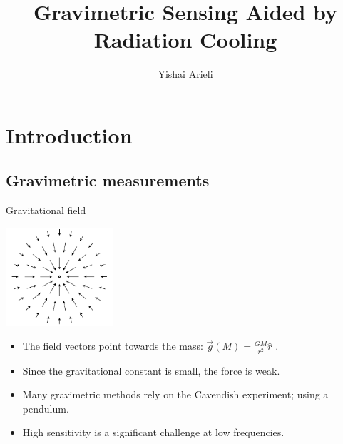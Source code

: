 \documentclass{beamer}
\title[Gravimetric Sensing Aided by Radiation Cooling]{Gravimetric Sensing Aided by Radiation Cooling}
\author[Yishai Arieli]{Yishai Arieli}
\begin{document}
	\typesetFrontSlides

\section{Introduction}



\subsection{Gravimetric measurements}
\begin{frame}{\hypertarget{frame:Gravitational field}{Gravitational field}}
	\begin{center}		
		\includegraphics[width=0.3\textwidth,keepaspectratio]{gravity.png}
    \end{center}
	\begin{itemize}
		\item The field vectors point towards the mass: $\overrightarrow{g}(M) = \frac{GM}{r^2}\hat{r}$ .
		\item Since the gravitational constant is small, the force is weak.
		\item Many gravimetric methods rely on the Cavendish experiment; using a pendulum.
		\item High sensitivity is a significant challenge at low frequencies.
		\end{itemize}
\end{frame}
\end{document}

